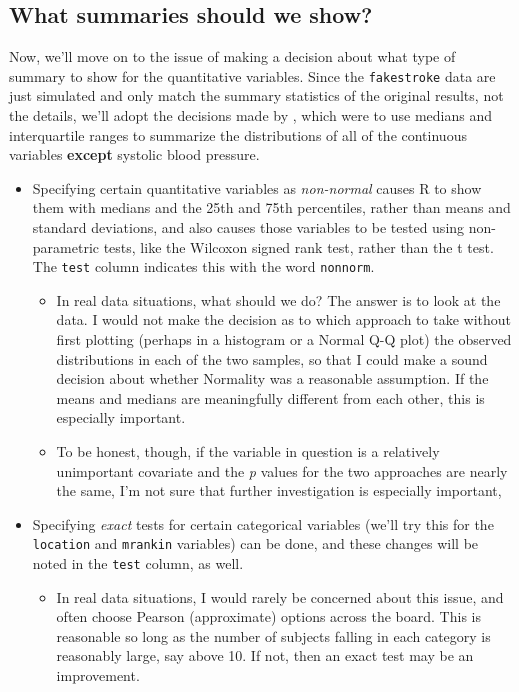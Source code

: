 \documentclass[]{book}
\providecommand{\tightlist}{%
  \setlength{\itemsep}{0pt}\setlength{\parskip}{0pt}}
\theoremstyle{definition}
\theoremstyle{definition}
\theoremstyle{definition}
\theoremstyle{remark}
\begin{document}
\subsection{What summaries should we
show?}\label{what-summaries-should-we-show}

Now, we'll move on to the issue of making a decision about what type of
summary to show for the quantitative variables. Since the
\texttt{fakestroke} data are just simulated and only match the summary
statistics of the original results, not the details, we'll adopt the
decisions made by \citet{Berkhemer2015}, which were to use medians and
interquartile ranges to summarize the distributions of all of the
continuous variables \textbf{except} systolic blood pressure.

\begin{itemize}
\tightlist
\item
  Specifying certain quantitative variables as \emph{non-normal} causes
  R to show them with medians and the 25th and 75th percentiles, rather
  than means and standard deviations, and also causes those variables to
  be tested using non-parametric tests, like the Wilcoxon signed rank
  test, rather than the t test. The \texttt{test} column indicates this
  with the word \texttt{nonnorm}.

  \begin{itemize}
  \tightlist
  \item
    In real data situations, what should we do? The answer is to look at
    the data. I would not make the decision as to which approach to take
    without first plotting (perhaps in a histogram or a Normal Q-Q plot)
    the observed distributions in each of the two samples, so that I
    could make a sound decision about whether Normality was a reasonable
    assumption. If the means and medians are meaningfully different from
    each other, this is especially important.
  \item
    To be honest, though, if the variable in question is a relatively
    unimportant covariate and the \emph{p} values for the two approaches
    are nearly the same, I'm not sure that further investigation is
    especially important,
  \end{itemize}
\item
  Specifying \emph{exact} tests for certain categorical variables (we'll
  try this for the \texttt{location} and \texttt{mrankin} variables) can
  be done, and these changes will be noted in the \texttt{test} column,
  as well.

  \begin{itemize}
  \tightlist
  \item
    In real data situations, I would rarely be concerned about this
    issue, and often choose Pearson (approximate) options across the
    board. This is reasonable so long as the number of subjects falling
    in each category is reasonably large, say above 10. If not, then an
    exact test may be an improvement.
  \end{itemize}
\end{itemize}
\end{document}
